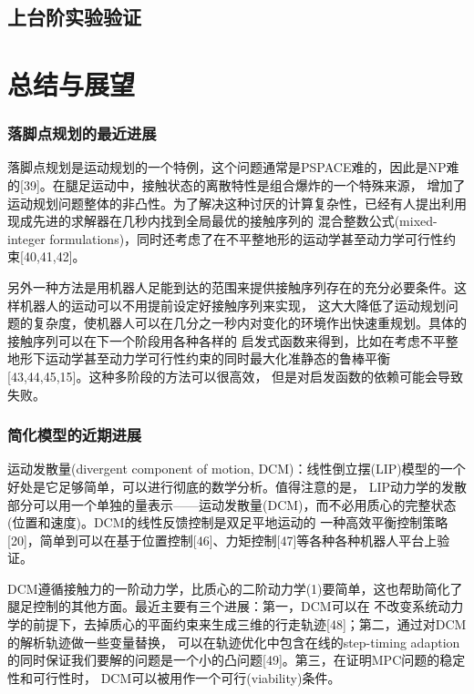 \section{上台阶实验验证}
\label{stair_experiment}

\chapter{总结与展望}

\subsection{落脚点规划的最近进展}
落脚点规划是运动规划的一个特例，这个问题通常是PSPACE难的，因此是NP难的[39]。在腿足运动中，接触状态的离散特性是组合爆炸的一个特殊来源，
增加了运动规划问题整体的非凸性。为了解决这种讨厌的计算复杂性，已经有人提出利用现成先进的求解器在几秒内找到全局最优的接触序列的
混合整数公式(mixed-integer formulations)，同时还考虑了在不平整地形的运动学甚至动力学可行性约束[40,41,42]。

另外一种方法是用机器人足能到达的范围来提供接触序列存在的充分必要条件。这样机器人的运动可以不用提前设定好接触序列来实现，
这大大降低了运动规划问题的复杂度，使机器人可以在几分之一秒内对变化的环境作出快速重规划。具体的接触序列可以在下一个阶段用各种各样的
启发式函数来得到，比如在考虑不平整地形下运动学甚至动力学可行性约束的同时最大化准静态的鲁棒平衡[43,44,45,15]。这种多阶段的方法可以很高效，
但是对启发函数的依赖可能会导致失败。

\subsection{简化模型的近期进展}
运动发散量(divergent component of motion, DCM)：线性倒立摆(LIP)模型的一个好处是它足够简单，可以进行彻底的数学分析。值得注意的是，
LIP动力学的发散部分可以用一个单独的量表示——运动发散量(DCM)，而不必用质心的完整状态(位置和速度)。DCM的线性反馈控制是双足平地运动的
一种高效平衡控制策略[20]，简单到可以在基于位置控制[46]、力矩控制[47]等各种各种机器人平台上验证。

DCM遵循接触力的一阶动力学，比质心的二阶动力学(1)要简单，这也帮助简化了腿足控制的其他方面。最近主要有三个进展：第一，DCM可以在
不改变系统动力学的前提下，去掉质心的平面约束来生成三维的行走轨迹[48]；第二，通过对DCM的解析轨迹做一些变量替换，
可以在轨迹优化中包含在线的step-timing adaption的同时保证我们要解的问题是一个小的凸问题[49]。第三，在证明MPC问题的稳定性和可行性时，
DCM可以被用作一个可行(viability)条件。

